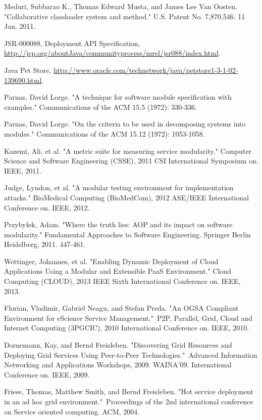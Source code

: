 \documentclass[conference]{IEEEtran}
\begin{document}
\begin{thebibliography}{9}
Meduri, Subbarao K., Thomas Edward Musta, and James Lee Van Oosten. "Collaborative classloader system and method." U.S. Patent No. 7,870,546. 11 Jan. 2011.

JSR-000088, Deployment API Specification, \url{http://jcp.org/aboutJava/communityprocess/mrel/jsr088/index.html}.

Java Pet Store, \url{http://www.oracle.com/technetwork/java/petstore1-3-1-02-139690.html}.



Parnas, David Lorge. "A technique for software module specification with examples." Communications of the ACM 15.5 (1972): 330-336.

Parnas, David Lorge. "On the criteria to be used in decomposing systems into modules." Communications of the ACM 15.12 (1972): 1053-1058.

Kazemi, Ali, et al. "A metric suite for measuring service modularity." Computer Science and Software Engineering (CSSE), 2011 CSI International Symposium on. IEEE, 2011.

Judge, Lyndon, et al. "A modular testing environment for implementation attacks." BioMedical Computing (BioMedCom), 2012 ASE/IEEE International Conference on. IEEE, 2012.

Przybyłek, Adam. "Where the truth lies: AOP and its impact on software modularity." Fundamental Approaches to Software Engineering. Springer Berlin Heidelberg, 2011. 447-461.

Wettinger, Johannes, et al. "Enabling Dynamic Deployment of Cloud Applications Using a Modular and Extensible PaaS Environment." Cloud Computing (CLOUD), 2013 IEEE Sixth International Conference on. IEEE, 2013.

Florian, Vladimir, Gabriel Neagu, and Stefan Preda. "An OGSA Compliant Environment for eScience Service Management." P2P, Parallel, Grid, Cloud and Internet Computing (3PGCIC), 2010 International Conference on. IEEE, 2010.

Dornemann, Kay, and Bernd Freisleben. "Discovering Grid Resources and Deploying Grid Services Using Peer-to-Peer Technologies." Advanced Information Networking and Applications Workshops, 2009. WAINA'09. International Conference on. IEEE, 2009.

Friese, Thomas, Matthew Smith, and Bernd Freisleben. "Hot service deployment in an ad hoc grid environment." Proceedings of the 2nd international conference on Service oriented computing. ACM, 2004.


\end{thebibliography}
\end{document}
